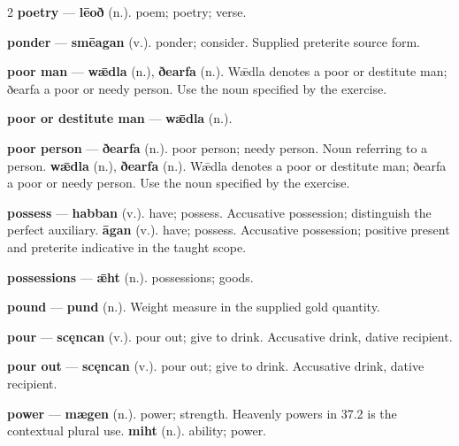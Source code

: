 \begin{multicols}{2}
\textbf{poetry} — \textbf{lēoð} (n.). poem; poetry; verse.\par
\textbf{ponder} — \textbf{smēagan} (v.). ponder; consider. Supplied preterite source form.\par
\textbf{poor man} — \textbf{wǣdla} (n.), \textbf{ðearfa} (n.). Wǣdla denotes a poor or destitute man; ðearfa a poor or needy person. Use the noun specified by the exercise.\par
\textbf{poor or destitute man} — \textbf{wǣdla} (n.).\par
\textbf{poor person} — \textbf{ðearfa} (n.). poor person; needy person. Noun referring to a person. \textbf{wǣdla} (n.), \textbf{ðearfa} (n.). Wǣdla denotes a poor or destitute man; ðearfa a poor or needy person. Use the noun specified by the exercise.\par
\textbf{possess} — \textbf{habban} (v.). have; possess. Accusative possession; distinguish the perfect auxiliary. \textbf{āgan} (v.). have; possess. Accusative possession; positive present and preterite indicative in the taught scope.\par
\textbf{possessions} — \textbf{ǣht} (n.). possessions; goods.\par
\textbf{pound} — \textbf{pund} (n.). Weight measure in the supplied gold quantity.\par
\textbf{pour} — \textbf{scęncan} (v.). pour out; give to drink. Accusative drink, dative recipient.\par
\textbf{pour out} — \textbf{scęncan} (v.). pour out; give to drink. Accusative drink, dative recipient.\par
\textbf{power} — \textbf{mægen} (n.). power; strength. Heavenly powers in 37.2 is the contextual plural use. \textbf{miht} (n.). ability; power.\par

\end{multicols}
